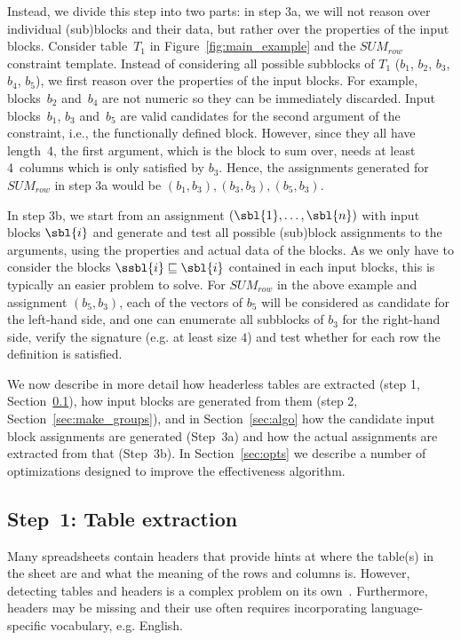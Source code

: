 Instead, we divide this step into two parts: in step 3a, we will not reason over individual (sub)blocks and their data, but rather over the properties of the input blocks.
Consider table~$T_1$ in Figure~\ref{fig:main_example} and the $\textit{SUM}_{row}$ constraint template. %
Instead of considering all possible subblocks of $T_1$ ($b_1$, $b_2$, $b_3$, $b_4$, $b_5$), we first reason over the properties of the input blocks.
For example, blocks~$b_2$ and~$b_4$  are not numeric so they can be immediately discarded.
Input blocks~$b_1$, $b_3$ and~$b_5$ are valid candidates for the second argument of the constraint, i.e., the functionally defined block.
However, since they all have length~4, the first argument, which is the block to sum over, needs at least 4~columns which is only satisfied by $b_3$.
Hence, the assignments generated for $\textit{SUM}_{row}$ in step 3a would be $(b_1, b_3), (b_3, b_3), (b_5, b_3)$.

In step 3b, we start from an assignment $(\sbl{1}, \ldots, \sbl{n})$ with input blocks $\sbl{i}$ and generate and test all possible (sub)block assignments to the arguments, using the properties and actual data of the blocks.
As we only have to consider the blocks $\ssbl{i} \sqsubseteq \sbl{i}$ contained in each input blocks, this is typically an easier problem to solve.
For $\textit{SUM}_{row}$ in the above example and assignment $(b_5, b_3)$, each of the vectors of $b_5$ will be considered as candidate for the left-hand side, and one can enumerate all subblocks of $b_3$ for the right-hand side, verify the signature (e.g. at least size $4$) and test whether for each row the definition is satisfied. %

We now describe in more detail how headerless tables are extracted (step 1, Section~\ref{sec:table_extraction}), how input blocks are generated from them (step 2, Section~\ref{sec:make_groups}), and in Section~\ref{sec:algo} how the candidate input block assignments are generated (Step~3a) %
and how the actual assignments are extracted from that (Step~3b).
In Section~\ref{sec:opts} we describe a number of optimizations designed to improve the effectiveness algorithm.





\subsection{Step~1: Table extraction}
\label{sec:table_extraction}
Many spreadsheets contain headers that provide hints at where the table(s) in the sheet are and what the meaning of the rows and columns is. However, detecting tables and headers is a complex problem on its own~\cite{header}. Furthermore, headers may be missing and their use often requires incorporating language-specific vocabulary, e.g. English.

